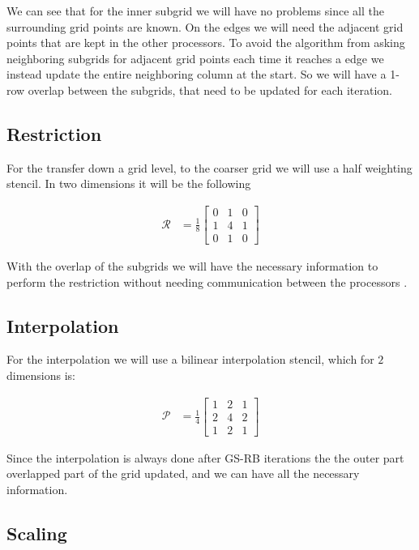 		We can see that for the inner subgrid we will have no problems since
		all the surrounding grid points are known. On the edges we will need the adjacent
		grid points that are kept in the other processors. To avoid the algorithm
		from asking neighboring subgrids for adjacent grid points each time it
		reaches a edge we instead update the entire neighboring column at the start.
		So we will have a 1-row overlap between the subgrids, that need to be updated
		for each iteration.


	\subsection{Restriction}
		For the transfer down a grid level, to the coarser grid we will use a half
		weighting stencil. In two dimensions it will be the following

		\begin{align}
			\mathcal{R} &= \frac{1}{8}
			\begin{bmatrix}
				0 & 1 & 0
				\\
				1 & 4 & 1
				\\
				0 & 1 & 0
			\end{bmatrix}
		\end{align}

		With the overlap of the subgrids we will have the necessary information to
		perform the restriction without needing communication between the processors
		\citep{hackbusch_multigrid_1982}.

	\subsection{Interpolation}
		For the interpolation we will use a bilinear interpolation stencil,
		which for \(2\) dimensions is:

		\begin{align}
			\mathcal{P} &= \frac{1}{4}
			\begin{bmatrix}
				1 & 2 & 1
				\\
				2 & 4 & 2
				\\
				1 & 2 & 1
			\end{bmatrix}
		\end{align}

		Since the interpolation is always done after GS-RB iterations the the outer
		part overlapped part of the grid updated, and we can have all the necessary
		information.

	\subsection{Scaling}
